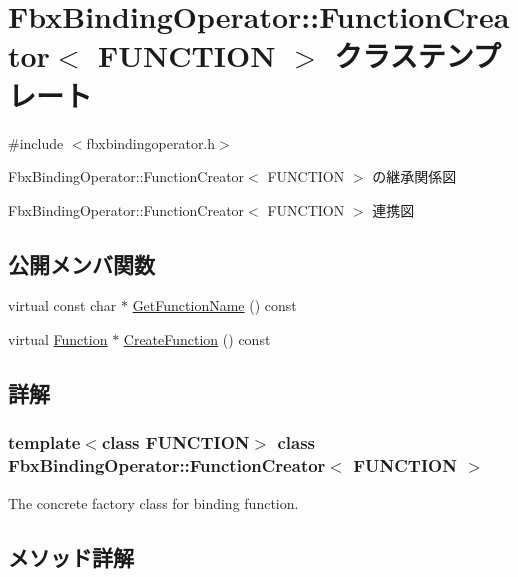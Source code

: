 \hypertarget{class_fbx_binding_operator_1_1_function_creator}{}\section{Fbx\+Binding\+Operator\+:\+:Function\+Creator$<$ F\+U\+N\+C\+T\+I\+ON $>$ クラステンプレート}
\label{class_fbx_binding_operator_1_1_function_creator}


{\ttfamily \#include $<$fbxbindingoperator.\+h$>$}



Fbx\+Binding\+Operator\+:\+:Function\+Creator$<$ F\+U\+N\+C\+T\+I\+ON $>$ の継承関係図


Fbx\+Binding\+Operator\+:\+:Function\+Creator$<$ F\+U\+N\+C\+T\+I\+ON $>$ 連携図
\subsection*{公開メンバ関数}
\begin{DoxyCompactItemize}
\item 
virtual const char $\ast$ \hyperlink{class_fbx_binding_operator_1_1_function_creator_ae54e4bf8030e91bcd1b6fe5e9126be9d}{Get\+Function\+Name} () const
\item 
virtual \hyperlink{class_fbx_binding_operator_1_1_function}{Function} $\ast$ \hyperlink{class_fbx_binding_operator_1_1_function_creator_a0d7fd7fb26969b0b2a46b6a44e6e2ac8}{Create\+Function} () const
\end{DoxyCompactItemize}


\subsection{詳解}
\subsubsection*{template$<$class F\+U\+N\+C\+T\+I\+ON$>$\newline
class Fbx\+Binding\+Operator\+::\+Function\+Creator$<$ F\+U\+N\+C\+T\+I\+O\+N $>$}

The concrete factory class for binding function. 

\subsection{メソッド詳解}
\mbox{\label{class_fbx_binding_operator_1_1_function_creator_a0d7fd7fb26969b0b2a46b6a44e6e2ac8}} 
